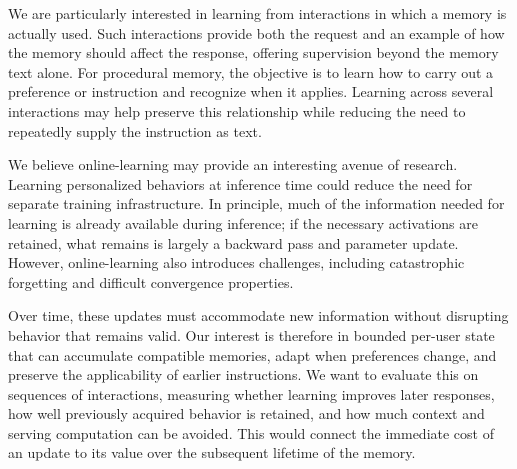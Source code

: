 We are particularly interested in learning from interactions in which a memory
is actually used. Such interactions provide both the request and an example
of how the memory should affect the response, offering supervision beyond the
memory text alone. For procedural memory, the objective is to learn how to
carry out a preference or instruction and recognize when it applies. Learning
across several interactions may help preserve this relationship while reducing
the need to repeatedly supply the instruction as text.

We believe online-learning may provide an interesting avenue of research.
Learning personalized behaviors at inference time could reduce the need for
separate training infrastructure. In principle, much of the information needed
for learning is already available during inference; if the necessary
activations are retained, what remains is largely a backward pass and parameter
update. However, online-learning also introduces challenges, including
catastrophic forgetting and difficult convergence properties.

Over time, these updates must accommodate new information without disrupting
behavior that remains valid. Our interest is therefore in bounded per-user
state that can accumulate compatible memories, adapt when preferences change,
and preserve the applicability of earlier instructions. We want to evaluate
this on sequences of interactions, measuring whether learning improves later
responses, how well previously acquired behavior is retained, and how much
context and serving computation can be avoided. This would connect the
immediate cost of an update to its value over the subsequent lifetime of the
memory.

